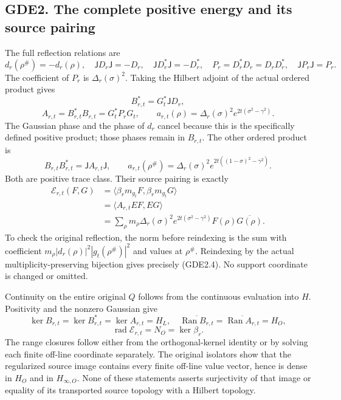 \subsection{GDE2. The complete positive energy and its source
pairing}\label{gde2.-the-complete-positive-energy-and-its-source-pairing}

The full reflection relations are \[
d_r(\rho^\#)=-d_r(\rho),\quad
\mathsf JD_r\mathsf J=-D_r,\quad
\mathsf JD_r^*\mathsf J=-D_r^*,
\quad P_r=D_r^*D_r=D_rD_r^*,\quad \mathsf JP_r\mathsf J=P_r.
\tag{GDE2.1}
\] The coefficient of \(P_r\) is \(\Delta_r(\sigma)^2\). Taking the
Hilbert adjoint of the actual ordered product gives \[
B_{r,t}^*=G_t^*\mathsf JD_r,
\] \[
\boxed{A_{r,t}=B_{r,t}^*B_{r,t}=G_t^*P_rG_t,
\qquad a_{r,t}(\rho)=\Delta_r(\sigma)^2e^{2t(\sigma^2-\gamma^2)}.}
\tag{GDE2.2}
\] The Gaussian phase and the phase of \(d_r\) cancel because this is
the specifically defined positive product; those phases remain in
\(B_{r,t}\). The other ordered product is \[
B_{r,t}B_{r,t}^*=\mathsf JA_{r,t}\mathsf J,
\qquad a_{r,t}(\rho^\#)
=\Delta_r(\sigma)^2e^{2t((1-\sigma)^2-\gamma^2)}.
\tag{GDE2.3}
\] Both are positive trace class. Their source pairing is exactly \[
\begin{aligned}
\mathcal E_{r,t}(F,G)
&=\langle\beta_rm_{g_t}F,\beta_rm_{g_t}G\rangle\\
&=\langle A_{r,t}EF,EG\rangle\\
&=\sum_\rho m_\rho\Delta_r(\sigma)^2
e^{2t(\sigma^2-\gamma^2)}F(\rho)\overline{G(\rho)}.
\end{aligned}
\tag{GDE2.4}
\] To check the original reflection, the norm before reindexing is the
sum with coefficient \(m_\rho|d_r(\rho)|^2|g_t(\rho^\#)|^2\) and values
at \(\rho^\#\). Reindexing by the actual multiplicity-preserving
bijection gives precisely (GDE2.4). No support coordinate is changed or
omitted.

Continuity on the entire original \(Q\) follows from the continuous
evaluation into \(H\). Positivity and the nonzero Gaussian give \[
\ker B_{r,t}=\ker B_{r,t}^*=\ker A_{r,t}=H_L,
\quad\overline{\operatorname{Ran}B_{r,t}}
=\overline{\operatorname{Ran}A_{r,t}}=H_O,
\] \[
\operatorname{rad}\mathcal E_{r,t}=N_O=\ker\beta_r.
\tag{GDE2.5}
\] The range closures follow either from the orthogonal-kernel identity
or by solving each finite off-line coordinate separately. The original
isolators show that the regularized source image contains every finite
off-line value vector, hence is dense in \(H_O\) and in
\(H_{\infty,O}\). None of these statements asserts surjectivity of that
image or equality of its transported source topology with a Hilbert
topology.

